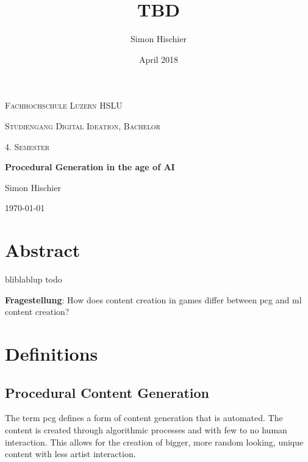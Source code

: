 \documentclass[10pt,a4paper]{article}
\title{TBD}
\author{Simon Hischier}
\date{April 2018}
\begin{document}
\begin{titlepage}
\centering
\vspace{1cm}
	{\scshape\LARGE Fachhochschule Luzern HSLU \par}
	\vspace{1cm}
	{\scshape\Large Studiengang Digital Ideation, Bachelor \par}
	
	{\scshape\Large 4. Semester\par}
	\vspace{1.5cm}
	{\huge\bf Procedural Generation in the age of AI\par}
	
	\vspace{10cm}
	{\Large Simon Hischier\par}
	\vfill

	{\large \today\par}
\end{titlepage}

\renewcommand{\contentsname}{Inhalt}
\tableofcontents
\newpage

\section{Abstract}
bliblablup todo

\textbf{Fragestellung}: How does content creation in games differ between \gls{pcg} and \gls{ml} content creation?

\section{Definitions}
\subsection{Procedural Content Generation}
The term \gls{pcg} defines a form of content generation that is automated. The content is created through algorithmic processes and with few to no human interaction. This allows for the creation of bigger, more random looking, unique content with less artist interaction.\cite{VanderLinden2014}
\end{document}
